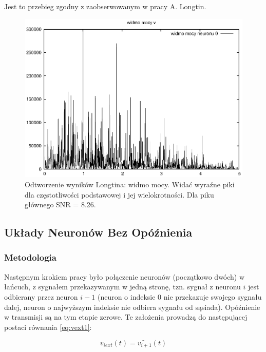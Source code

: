   Jest to przebieg zgodny z zaobserwowanym w pracy A. Longtin.

  \begin{figure}
    \includegraphics[width=140mm]{images/1neuron/3}
    \caption{Odtworzenie wyników Longtina: widmo mocy. Widać wyraźne piki dla częstotliwości podstawowej i jej wielokrotności. Dla piku głównego SNR = 8.26.}
    \label{graphics:sym1fft}
  \end{figure}

  
  \subsection{Układy Neuronów Bez Opóźnienia}
  \label{sec:uklad_bez_opoznienia}

  \subsubsection{Metodologia}
  
  Następnym krokiem pracy było połączenie neuronów (początkowo dwóch) w łańcuch, z sygnałem przekazywanym w jedną stronę, tzn. sygnał z neuronu $i$ jest odbierany przez neuron $i-1$ (neuron o indeksie 0 nie przekazuje swojego sygnału dalej, neuron o najwyższym indeksie nie odbiera sygnału od sąsiada). Opóźnienie w transmisji są na tym etapie zerowe. Te założenia prowadzą do następującej postaci równania \ref{eq:vext1}:

  \begin{equation} \label{eq:vext2}
    v_{i ext}(t) = \widetilde{v_{i+1}}(t)
  \end{equation}


